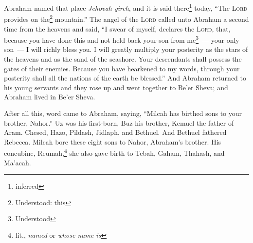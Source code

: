 \begin{inparaenum}
     Abraham named that place \textit{Jehovah-yireh}, and it is said there\footnote{inferred} today, ``The \textsc{Lord} provides on the\footnote{Understood: this} mountain.''%
     The angel of the \textsc{Lord} called unto Abraham a second time from the heavens%
     and said, ``I swear of myself, declares the \textsc{Lord}, that, because you have done this and not held back your son from me\footnote{Understood}~--- your only son~---%
     I will richly bless you. I will greatly multiply your posterity as the stars of the heavens and as the sand of the seashore. Your descendants shall possess the gates of their enemies.%
     Because you have hearkened to my words, through your posterity shall all the nations of the earth be blessed.''%
     And Abraham returned to his young servants and they rose up and went together to Be'er Sheva; and Abraham lived in Be'er Sheva.%
    
     After all this, word came to Abraham, saying, ``Milcah has birthed sons to your brother, Nahor.''%
     Uz was his first-born, Buz his brother, Kemuel the father of Aram.%
     Chesed, Hazo, Pildash, Jidlaph, and Bethuel.%
     And Bethuel fathered Rebecca. Milcah bore these eight sons to Nahor, Abraham's brother.%
     His concubine, Reumah,\footnote{lit., \textit{named} or \textit{whose name is}} she also gave birth to Tebah, Gaham, Thahash, and Ma'acah.%
\end{inparaenum}
